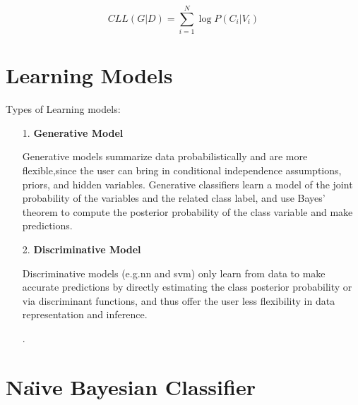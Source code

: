 \[CLL (G|D)=\sum_{i=1}^{N}\log P(C_i|V_i) \]
\newpage
\par
\section{Learning Models}
\par 
Types of Learning models:
\begin{enumerate}
\item[1.] \textbf{Generative Model}
\par
Generative models summarize data probabilistically and are more flexible,since the user can bring in conditional independence assumptions, priors, and hidden variables. Generative classifiers learn a model of the joint probability of the variables and the related class label, and use Bayes’ theorem to compute the posterior probability of the class variable and make predictions. 

\item[2.] \textbf{Discriminative Model}
\par
Discriminative models (e.g.\acs{nn} and \acs{svm}) only learn from data to make accurate predictions by directly estimating the class posterior probability or via discriminant functions, and thus offer the user less flexibility in data representation and inference.
\item[.] 
\end{enumerate}
\section{Na\"{\i}ve Bayesian Classifier}

